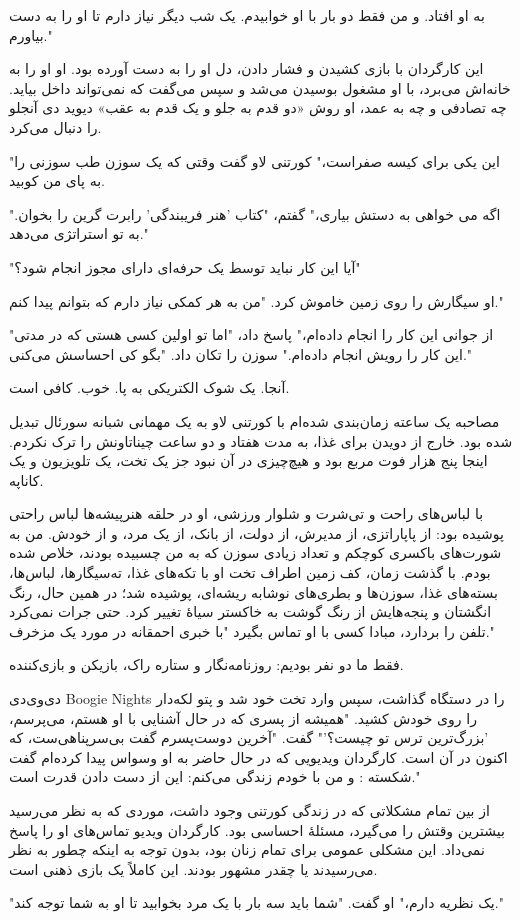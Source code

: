 
به او افتاد. و من فقط دو بار با او خوابیدم. یک شب دیگر نیاز دارم تا او را به دست بیاورم."

این کارگردان با بازی کشیدن و فشار دادن، دل او را به دست آورده بود. او او را به خانه‌اش می‌برد، با او مشغول بوسیدن می‌شد و سپس می‌گفت که نمی‌تواند داخل بیاید. چه تصادفی و چه به عمد، او روش «دو قدم به جلو و یک قدم به عقب» دیوید دی آنجلو را دنبال می‌کرد.

"این یکی برای کیسه صفراست،" کورتنی لاو گفت وقتی که یک سوزن طب سوزنی را به پای من کوبید.

"اگه می‌ خواهی به دستش بیاری،" گفتم، "کتاب 'هنر فریبندگی' رابرت گرین را بخوان. به تو استراتژی می‌دهد."

"آیا این کار نباید توسط یک حرفه‌ای دارای مجوز انجام شود؟"

او سیگارش را روی زمین خاموش کرد. "من به هر کمکی نیاز دارم که بتوانم پیدا کنم."

"از جوانی این کار را انجام داده‌ام،" پاسخ داد، "اما تو اولین کسی هستی که در مدتی این کار را رویش انجام داده‌ام." سوزن را تکان داد. "بگو کی احساسش می‌کنی."

آنجا. یک شوک الکتریکی به پا. خوب. کافی است.

مصاحبه یک ساعته زمان‌بندی شده‌ام با کورتنی لاو به یک مهمانی شبانه سورئال تبدیل شده بود. خارج از دویدن برای غذا، به مدت هفتاد و دو ساعت چیناتاونش را ترک نکردم. اینجا پنج هزار فوت مربع بود و هیچ‌چیزی در آن نبود جز یک تخت، یک تلویزیون و یک کاناپه.

با لباس‌های راحت و تی‌شرت و شلوار ورزشی، او در حلقه هنرپیشه‌ها لباس راحتی پوشیده بود: از پاپاراتزی، از مدیرش، از دولت، از بانک، از یک مرد، و از خودش. من به شورت‌های باکسری کوچکم و تعداد زیادی سوزن که به من چسبیده بودند، خلاص شده بودم. با گذشت زمان، کف زمین اطراف تخت او با تکه‌های غذا، ته‌سیگارها، لباس‌ها، بسته‌های غذا، سوزن‌ها و بطری‌های نوشابه ریشه‌ای، پوشیده شد؛ در همین حال، رنگ انگشتان و پنجه‌هایش از رنگ گوشت به خاکستر سیاۀ تغییر کرد. حتی جرات نمی‌کرد تلفن را بردارد، مبادا کسی با او تماس بگیرد "با خبری احمقانه در مورد یک مزخرف."

فقط ما دو نفر بودیم: روزنامه‌نگار و ستاره راک، بازیکن و بازی‌کننده.

دی‌وی‌دی Boogie Nights را در دستگاه گذاشت، سپس وارد تخت خود شد و پتو لکه‌دار را روی خودش کشید. "همیشه از پسری که در حال آشنایی با او هستم، می‌پرسم، 'بزرگ‌ترین ترس تو چیست؟'" گفت. "آخرین دوست‌پسرم گفت بی‌سرپناهی‌ست، که اکنون در آن است. کارگردان ویدیویی که در حال حاضر به او وسواس پیدا کرده‌ام گفت شکسته‌ : و من با خودم زندگی می‌کنم: این از دست دادن قدرت است."

از بین تمام مشکلاتی که در زندگی کورتنی وجود داشت، موردی که به نظر می‌رسید بیشترین وقتش را می‌گیرد، مسئلهٔ احساسی بود. کارگردان ویدیو تماس‌های او را پاسخ نمی‌داد. این مشکلی عمومی برای تمام زنان بود، بدون توجه به اینکه چطور به نظر می‌رسیدند یا چقدر مشهور بودند. این کاملاً یک بازی ذهنی است.

"یک نظریه دارم،" او گفت. "شما باید سه بار با یک مرد بخوابید تا او به شما توجه کند."